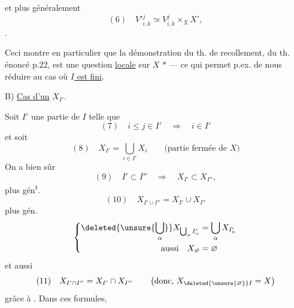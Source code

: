 et plus généralement
\[
(6)\quad V'{}^{j}_{i,k}\simeq V^{j}_{i,k}\times_X X',
\]
.

Ceci montre en particulier que la démonstration du th. de recollement, du th. énoncé p.22, est une question \uline{locale} sur $X$ \textcircled{$*$} --- ce qui permet p.ex. de nous réduire au cas où  \uline{$I$ est fini}.



B) \uline{Cas d'un} $X_{I'}$. 

Soit $I'$ une partie de $I$ telle que
\[
(7)\quad i\leq j\in I'\quad\Longrightarrow\quad i\in I'
\]
et soit
\[
(8)\quad X_{I'}=\bigcup_{i\in I'}X_i\qquad\text{(partie fermée de $X$)}
\]
On a bien sûr
\[
(9)\quad I'\subset I''\quad\Longrightarrow\quad X_{I'}\subset X_{I''},
\]
plus gén\textsuperscript{t}.
\[
(10)\quad X_{I'\cup I''}=X_{I'}\cup X_{I''}
\]
plus gén.
\[
\left\{\begin{aligned}
\deleted{\unsure{\bigcup_\alpha}}X_{\bigcup_\alpha I'_\alpha}&=\bigcup_\alpha X_{I'_\alpha}\\
\text{aussi}\quad X_{\varnothing}&=\varnothing
\end{aligned}\right.
\]
et aussi
\[
(11)\quad X_{I'\cap I''}=X_{I'}\cap X_{I''}\qquad
\left(\text{donc, }X_{\deleted{\unsure{\varnothing}}I}=X\right)
\]
grâce à . Dans ces formules,

